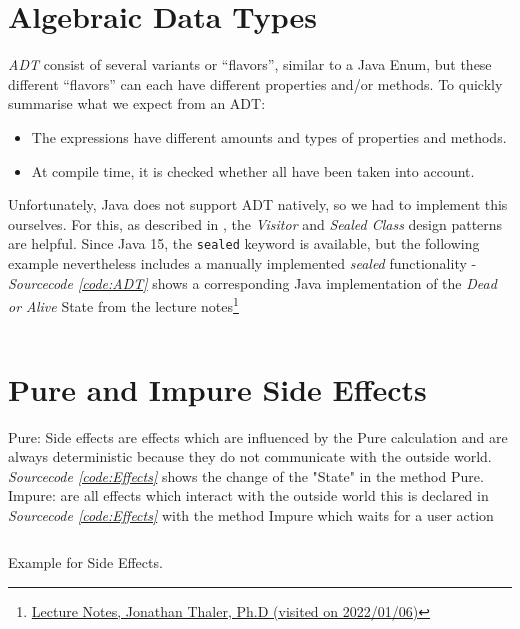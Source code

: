 \documentclass[a4paper,12pt,twoside]{scrreprt}
\begin{document}
\clearpage

\section{Algebraic Data Types}
\textit{\ac{ADT}} consist of several variants or \enquote{flavors}, similar to a Java Enum, but these different \enquote{flavors} can each have different properties and/or methods. To quickly summarise what we expect from an \ac{ADT}:
\begin{itemize}
    \item The expressions have different amounts and types of properties and methods.
    \item At compile time, it is checked whether all have been taken into account.
\end{itemize}

Unfortunately, Java does not support \ac{ADT} natively, so we had to implement this ourselves. For this, as described in \cite{MAINIERO_algebraic_2020}, the \textit{Visitor} and \textit{Sealed Class} design patterns are helpful. Since Java 15, the \texttt{sealed} keyword is available, but the following example nevertheless includes a manually implemented \textit{sealed} functionality - \textit{Sourcecode \ref{code:ADT}} shows a corresponding Java implementation of the \textit{Dead or Alive} State from the lecture notes\footnote{\href{https://homepages.fhv.at/thjo/lecturenotes/concepts/declaring-types.html\#algebraic-data-types-1}{Lecture Notes, Jonathan Thaler, Ph.D (visited on 2022/01/06)}}

\inputminted[fontsize=\footnotesize,linenos,breaklines,breakanywhere]{java}{./code/AlgebraicDataTypes.java}

\clearpage

\section{Pure and Impure Side Effects}
Pure: Side effects are effects which are influenced by the Pure calculation and are always deterministic because they do not communicate with the outside world. \emph{Sourcecode \ref{code:Effects}} shows the change of the "State" in the method Pure.
\newline
Impure: are all effects which interact with the outside world this is declared in \emph{Sourcecode \ref{code:Effects}} with the method Impure which waits for a user action
\begin{listing}[ht]
    \inputminted[fontsize=\footnotesize,linenos]{java}{./code/SideEffects.java}
    \caption[Example for Side Effects]{Example for Side Effects.}
    \label{code:Effects}
\end{listing}
\clearpage
\end{document}
